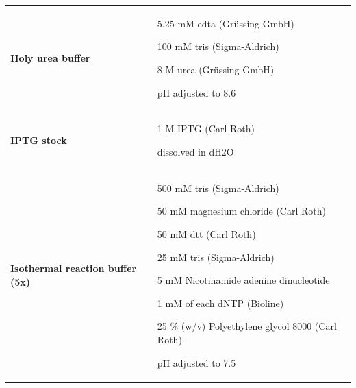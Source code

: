 \begin{longtable}{|Y{3.9cm}|m{10.7cm}|}
\textbf{Holy urea buffer} & \vspace{2mm}
            5.25 mM       \gls{edta}            (Grüssing GmbH)  \par \vspace{2mm}
            100 mM        \gls{tris}            (Sigma-Aldrich)  \par \vspace{2mm}
            8 M           urea                  (Grüssing GmbH)  \par \vspace{2mm}
            pH adjusted to 8.6 \vspace{2mm} \\

\textbf{\Gls{IPTG} stock}  &\vspace{2mm}
                1 M \gls{IPTG}   (Carl Roth)             \par \vspace{2mm}
                dissolved in \gls{dH2O}            \vspace{2mm} \\

\textbf{Isothermal reaction buffer (5x)} & \vspace{2mm}
            500 mM        \gls{tris}                  (Sigma-Aldrich)       \par \vspace{2mm}
            50 mM         magnesium chloride          (Carl Roth)            \par \vspace{2mm}
            50 mM         \gls{dtt}                   (Carl Roth)            \par \vspace{2mm}
            25 mM         \gls{tris}                  (Sigma-Aldrich)        \par \vspace{2mm}
            5 mM          Nicotinamide adenine dinucleotide                 \par \vspace{2mm}
            1 mM          of each \gls{dNTP}          (Bioline)              \par \vspace{2mm}
            25 \% (w/v)    Polyethylene glycol 8000    (Carl Roth)            \par \vspace{2mm}
            pH adjusted to 7.5 \vspace{2mm}\\    


\end{longtable}
